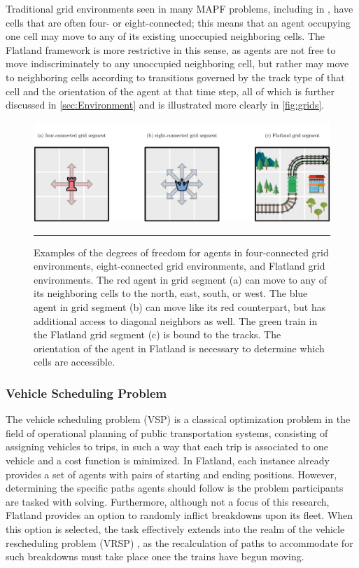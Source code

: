 \documentclass[11pt]{article}
\begin{document}
Traditional grid environments seen in many MAPF problems, including in \citep{standley10a}, have cells that are often four- or eight-connected; this means that an agent occupying one cell may move to any of its existing unoccupied neighboring cells.  The Flatland framework is more restrictive in this sense, as agents are not free to move indiscriminately to any unoccupied neighboring cell, but rather may move to neighboring cells according to transitions governed by the track type of that cell and the orientation of the agent at that time step, all of which is further discussed in \autoref{sec:Environment} and is illustrated more clearly in \autoref{fig:grids}.

\begin{figure}[t]
\centering
\includegraphics[width=\textwidth]{chess2}
\caption{Examples of the degrees of freedom for agents in four-connected grid environments, eight-connected grid environments, and Flatland grid environments. The red agent in grid segment (a) can move to any of its neighboring cells to the north, east, south, or west.  The blue agent in grid segment (b) can move like its red counterpart, but has additional access to diagonal neighbors as well.  The green train in the Flatland grid segment (c) is bound to the tracks.  The orientation of the agent in Flatland is necessary to determine which cells are accessible. }
\label{fig:grids}

\begin{center}
{\color{lightgray} \rule{\linewidth}{0.15mm}}
\end{center}

\end{figure}

\subsubsection{Vehicle Scheduling Problem}
The vehicle scheduling problem (VSP) \citep{bapeukfa00a} is a classical optimization problem in the field of operational planning of public transportation systems, consisting of assigning vehicles to trips, in such a way that each trip is associated to one vehicle and a cost function is minimized.  In Flatland, each instance already provides a set of agents with pairs of starting and ending positions.  However, determining the specific paths agents should follow is the problem participants are tasked with solving.  Furthermore, although not a focus of this research, Flatland provides an option to randomly inflict breakdowns upon its fleet.  When this option is selected, the task effectively extends into the realm of the vehicle rescheduling problem (VRSP) \citep{limibo07a}, as the recalculation of paths to accommodate for such breakdowns must take place once the trains have begun moving.
\end{document}
